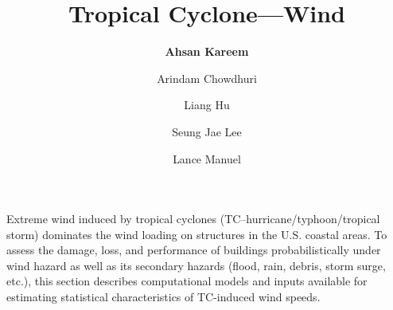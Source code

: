 %
%
%


%
%
%
%
%
%
%
%

\title{Tropical Cyclone---Wind}
\author{
    \textbf{Ahsan Kareem} 
    \and Arindam Chowdhuri
    \and Liang Hu
    \and Seung Jae Lee
    \and Lance Manuel}
\tocauthor{}
%
%
\maketitle

Extreme wind induced by tropical cyclones (TC--hurricane/typhoon/tropical storm) dominates the wind loading on structures in the U.S. coastal areas. To assess the damage, loss, and performance of buildings probabilistically under wind hazard as well as its secondary hazards (flood, rain, debris, storm surge, etc.), this section describes computational models and inputs available for estimating statistical characteristics of TC-induced wind speeds. 

